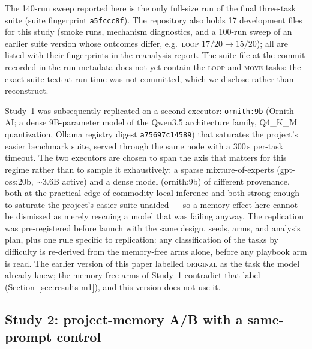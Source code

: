 \documentclass[smallcondensed,natbib]{svjour3}
\begin{document}
The 140-run sweep reported here is the only full-size run of the final
three-task suite (suite fingerprint \texttt{a5fccc8f}). The repository
also holds 17 development files for this study (smoke runs, mechanism
diagnostics, and a 100-run sweep of an earlier suite version whose
outcomes differ, e.g.\ \textsc{loop} $17/20\to15/20$); all are listed
with their fingerprints in the reanalysis report. The suite file at the
commit recorded in the run metadata does not yet contain the
\textsc{loop} and \textsc{move} tasks: the exact suite text at run time
was not committed, which we disclose rather than reconstruct.

Study~1 was subsequently replicated on a second executor:
\texttt{ornith:9b} (Ornith AI; a dense 9B-parameter model of the
Qwen3.5 architecture family, Q4\_K\_M quantization, Ollama registry
digest \texttt{a75697c14589}) that
saturates the project's easier benchmark suite, served through the
same node with a 300\,s per-task timeout. The two executors are chosen
to span the axis that matters for this regime rather than to sample it
exhaustively: a sparse mixture-of-experts (gpt-oss:20b, $\sim$3.6B
active) and a dense model (ornith:9b) of different provenance, both at
the practical edge of commodity local inference and both strong enough
to saturate the project's easier suite unaided --- so a memory effect
here cannot be dismissed as merely rescuing a model that was failing
anyway. The replication was
pre-registered before launch with the same design, seeds, arms, and
analysis plan, plus one rule specific to replication: any classification of the
tasks by difficulty is re-derived from the memory-free arms alone,
before any playbook arm is read. The earlier version of this paper
labelled \textsc{original} as the task the model already knew; the
memory-free arms of Study~1 contradict that label
(Section~\ref{sec:results-m1}), and this version does not use it.

\subsection{Study 2: project-memory A/B with a same-prompt
control}\label{sec:method-pm}
\end{document}

